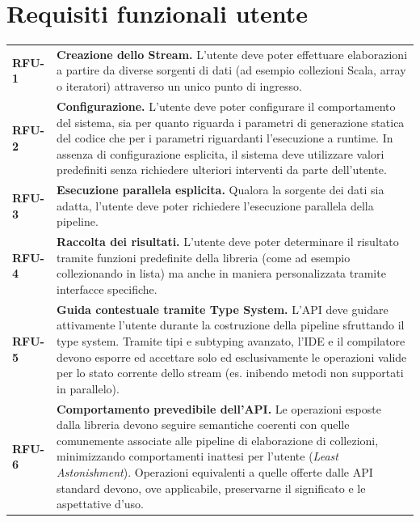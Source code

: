 \documentclass[a4paper,11pt]{report}
\theoremstyle{definition}
\begin{document}
\section{Requisiti funzionali utente}

\begin{longtable}{@{}p{}p{}@{}}
  \textbf{RFU-1} &
  \textbf{Creazione dello Stream.}
  L'utente deve poter effettuare elaborazioni a partire da diverse sorgenti di dati (ad esempio collezioni Scala, array o iteratori) attraverso un unico punto di ingresso.
  \\[0.5em]

  \textbf{RFU-2} &
  \textbf{Configurazione.}
  L'utente deve poter configurare il comportamento del sistema, sia per quanto riguarda i parametri di generazione statica del codice che per i parametri riguardanti l'esecuzione a runtime. In assenza di configurazione esplicita, il sistema deve utilizzare valori predefiniti senza richiedere ulteriori interventi da parte dell'utente.
  \\[0.5em]

  \textbf{RFU-3} &
  \textbf{Esecuzione parallela esplicita.}
  Qualora la sorgente dei dati sia adatta, l'utente deve poter richiedere l'esecuzione parallela della pipeline.
  \\[0.5em]

  \textbf{RFU-4} &
  \textbf{Raccolta dei risultati.}
  L'utente deve poter determinare il risultato tramite funzioni predefinite della libreria (come ad esempio collezionando in lista) ma anche in maniera personalizzata tramite interfacce specifiche.
  \\[0.5em]

  \textbf{RFU-5} &
  \textbf{Guida contestuale tramite Type System.}
  L'API deve guidare attivamente l'utente durante la costruzione della pipeline sfruttando il type system. Tramite tipi e subtyping avanzato, l'IDE e il compilatore devono esporre ed accettare solo ed esclusivamente le operazioni valide per lo stato corrente dello stream (es. inibendo metodi non supportati in parallelo).
  \\[0.5em]

  \textbf{RFU-6} &
  \textbf{Comportamento prevedibile dell'API.}
  Le operazioni esposte dalla libreria devono seguire semantiche coerenti con quelle comunemente associate alle pipeline di elaborazione di collezioni, minimizzando comportamenti inattesi per l'utente (\textit{Least Astonishment}). Operazioni equivalenti a quelle offerte dalle API standard devono, ove applicabile, preservarne il significato e le aspettative d'uso.
\end{longtable}
\end{document}
